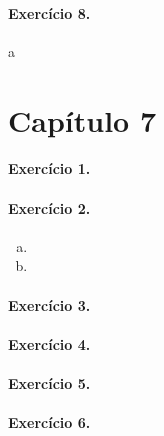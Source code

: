 \documentclass[12pt,a4paper]{article}
\begin{document}
\paragraph{Exercício 8.}
%
a
%
\section{Capítulo 7}

\paragraph{Exercício 1.} 
%

%
\paragraph{Exercício 2.}
%
\begin{enumerate}[a)]
    \item 
    \item
\end{enumerate}
%
\paragraph{Exercício 3.}
%

%
\paragraph{Exercício 4.} 
%

%
\paragraph{Exercício 5.} 
%

%
\paragraph{Exercício 6.}
%

%
\end{document}
